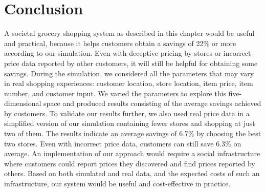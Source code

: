 \section{Conclusion}
A societal grocery shopping system as described in this chapter would be useful and practical, because it helps customers obtain a savings of 22\% or more according to our simulation. Even with deceptive pricing by stores or incorrect price data reported by other customers, it will still be helpful for obtaining some savings. During the simulation, we considered all the parameters that may vary in real shopping experiences: customer location, store location, item price, item number, and customer input. We varied the parameters to explore this five-dimensional space and produced results consisting of the average savings achieved by customers. To validate our results further, we also used real price data in a simplified version of our simulation containing fewer stores and shopping at just two of them. The results indicate an average savings of 6.7\% by choosing the best two stores. Even with incorrect price data, customers can still save 6.3\% on average. An implementation of our approach would require a social infrastructure where customers could report prices they discovered and find prices reported by others. Based on both simulated and real data, and the expected costs of such an infrastructure, our system would be useful and cost-effective in practice.